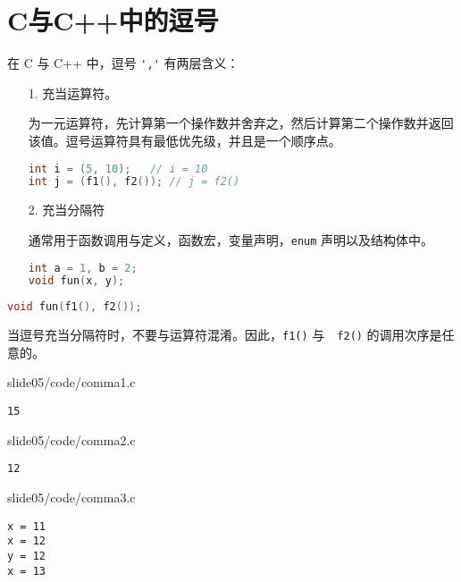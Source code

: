 \section{C与C++中的逗号}
\begin{frame}[fragile]\ft{\secname}
  在 C 与 C++ 中，逗号 \lstinline|','| 有两层含义：
  \begin{enumerate}
  \item[1.] 充当运算符。
  \item[] 为一元运算符，先计算第一个操作数并舍弃之，然后计算第二个操作数并返回该值。逗号运算符具有最低优先级，并且是一个顺序点。
    \pause
  
  \begin{lstlisting}[language=c,backgroundcolor=\color{red!10}]
int i = (5, 10);   // i = 10
int j = (f1(), f2()); // j = f2()
  \end{lstlisting} \pause 

\item[2.] 充当分隔符
\item[] 通常用于函数调用与定义，函数宏，变量声明，\lstinline|enum| 声明以及结构体中。 \pause 
  \begin{lstlisting}[language=c,backgroundcolor=\color{red!10}]
int a = 1, b = 2;
void fun(x, y);    
  \end{lstlisting}
\end{enumerate}
\end{frame}


\begin{frame}[fragile]\ft{\secname}

\begin{lstlisting}[language=c,backgroundcolor=\color{red!10}]
  void fun(f1(), f2());  
\end{lstlisting}
当逗号充当分隔符时，不要与运算符混淆。因此，\lstinline|f1()| 与　\lstinline|f2()| 的调用次序是任意的。
\end{frame}

\begin{frame}[fragile]\ft{\secname}
  
  {slide05/code/comma1.c}
  \pause
  \begin{lstlisting}[backgroundcolor=\color{red!20}]
15    
  \end{lstlisting}
  
\end{frame}
\begin{frame}[fragile]\ft{\secname}
  
  {slide05/code/comma2.c}
    \pause
  \begin{lstlisting}[backgroundcolor=\color{red!20}]
12    
  \end{lstlisting}
\end{frame}

\begin{frame}[fragile]\ft{\secname}
  
  {slide05/code/comma3.c}

  \pause
  \begin{lstlisting}[backgroundcolor=\color{red!20}]
x = 11
x = 12
y = 12
x = 13
  \end{lstlisting}

\end{frame}
 
